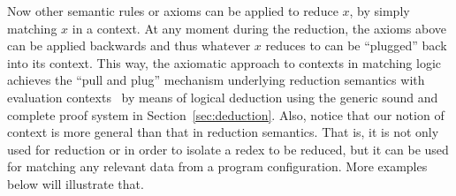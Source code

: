 \documentclass[acmsmall,review,anonymous]{acmart}
\begin{document}
Now other semantic rules or axioms can be applied to reduce $x$, by
simply matching $x$ in a context.
At any moment during the reduction, the axioms above can be applied
backwards and thus whatever $x$ reduces to can be ``plugged'' back into
its context.
This way, the axiomatic approach to contexts in matching logic
achieves the ``pull and plug'' mechanism underlying reduction
semantics with evaluation contexts~\cite{felleisen-hieb-92} by
means of logical deduction using the generic sound and complete
proof system in Section~\ref{sec:deduction}.
Also, notice that our notion of context is more general than
that in reduction semantics.
That is, it is not only used for reduction or in order to isolate
a redex to be reduced, but it can be used for matching any relevant
data from a program configuration.
More examples below will illustrate that.
\end{document}
